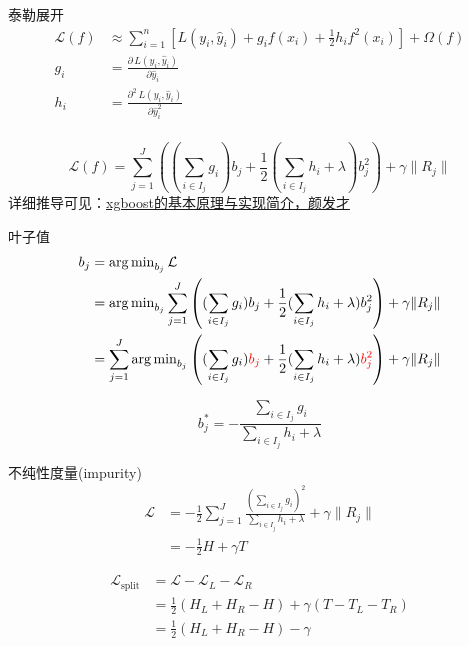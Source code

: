\begin{frame}{泰勒展开}
    \begin{align*}
        \mathcal{L}(f) &\approx \sum_{i=1}^n \left [ L(y_i, \hat{y}_i) + g_i f(x_i) + \frac{1}{2} h_i f^2(x_i) \right ] + \Omega(f) \\
        g_i &= \frac{\partial \, L(y_i, \hat{y}_i)}{\partial \hat{y}_i} \\
        h_i &= \frac{\partial^2 \, L(y_i, \hat{y}_i)}{\partial \hat{y}^2_i} \\
    \end{align*}

    \begin{equation*}
        \mathcal{L}(f) = \sum_{j=1}^J \left ( ( \sum_{i \in I_j} g_i ) b_j + \frac{1}{2} (\sum_{i \in I_j} h_i + \lambda) b_j^2 \right ) + \gamma \|R_j\|
    \end{equation*}
    {\tiny
    详细推导可见：\href{http://nbviewer.jupyter.org/github/facaiy/book_notes/blob/master/machine_learning/tree/gbdt/xgboost/intro.ipynb}{xgboost的基本原理与实现简介，颜发才}}
\end{frame}

\begin{frame}{叶子值}
    \begin{align*}
        b_j &= \operatorname{arg \, min}_{b_j} \mathcal{L} \\
            &= \operatorname{arg \, min}_{b_j} \sum_{j=1}^J \left ( ( \sum_{i \in I_j} g_i ) b_j + \frac{1}{2} (\sum_{i \in I_j} h_i + \lambda) b_j^2 \right ) + \gamma \|R_j\|  \\
            &= \sum_{j=1}^J \operatorname{arg \, min}_{b_j} \left ( ( \sum_{i \in I_j} g_i ) \textcolor{red}{b_j} + \frac{1}{2} (\sum_{i \in I_j} h_i + \lambda) \textcolor{red}{b_j^2} \right ) + \gamma \|R_j\|
    \end{align*}

    \vfill

    \begin{equation*}
        b^*_j = - \frac{\sum_{i \in I_j} g_i}{\sum_{i \in I_j} h_i + \lambda}
    \end{equation*}
\end{frame}

\begin{frame}{不纯性度量(impurity)}
    \begin{align*}
        \mathcal{L} &= - \frac{1}{2} \sum_{j=1}^J \frac{(\sum_{i \in I_j} g_i)^2}{\sum_{i \in I_j} h_i + \lambda} + \gamma \|R_j\| \\
                    &= - \frac{1}{2} H + \gamma T
    \end{align*}

    \vfill

    \begin{align*}
        \mathcal{L}_{\text{split}} &= \mathcal{L} - \mathcal{L}_L - \mathcal{L}_R \\
                                  &= \frac{1}{2} (H_L + H_R - H) + \gamma (T - T_L - T_R) \\
                                  &= \frac{1}{2} (H_L + H_R - H) - \gamma
    \end{align*}
\end{frame}

